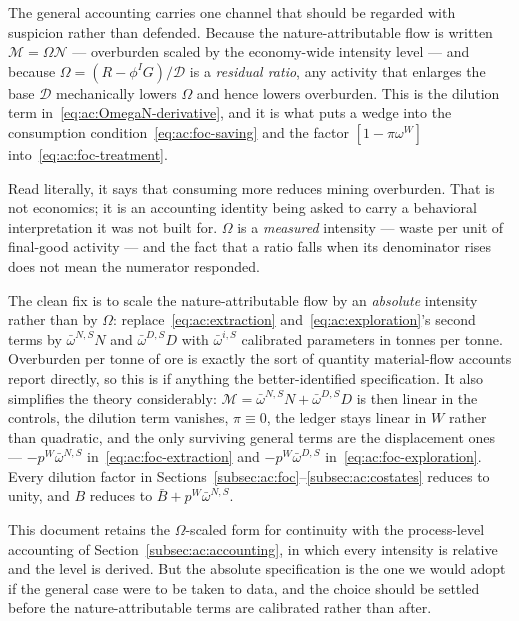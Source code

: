 \begin{remark}\label{rem:ac:dilution}
The general accounting carries one channel that should be regarded with suspicion rather than defended. Because the nature-attributable flow is written $\mathcal M=\Omega\mathcal N$ --- overburden scaled by the economy-wide intensity level --- and because $\Omega=\left(R-\phi^IG\right)/\mathcal D$ is a \emph{residual ratio}, any activity that enlarges the base $\mathcal D$ mechanically lowers $\Omega$ and hence lowers overburden. This is the dilution term in~\eqref{eq:ac:OmegaN-derivative}, and it is what puts a wedge into the consumption condition~\eqref{eq:ac:foc-saving} and the factor $\left[1-\pi\omega^W\right]$ into~\eqref{eq:ac:foc-treatment}.

Read literally, it says that consuming more reduces mining overburden. That is not economics; it is an accounting identity being asked to carry a behavioral interpretation it was not built for. $\Omega$ is a \emph{measured} intensity --- waste per unit of final-good activity --- and the fact that a ratio falls when its denominator rises does not mean the numerator responded.

The clean fix is to scale the nature-attributable flow by an \emph{absolute} intensity rather than by $\Omega$: replace~\eqref{eq:ac:extraction} and~\eqref{eq:ac:exploration}'s second terms by $\bar\omega^{N,S}N$ and $\bar\omega^{D,S}D$ with $\bar\omega^{i,S}$ calibrated parameters in tonnes per tonne. Overburden per tonne of ore is exactly the sort of quantity material-flow accounts report directly, so this is if anything the better-identified specification. It also simplifies the theory considerably: $\mathcal M=\bar\omega^{N,S}N+\bar\omega^{D,S}D$ is then linear in the controls, the dilution term vanishes, $\pi\equiv0$, the ledger stays linear in $W$ rather than quadratic, and the only surviving general terms are the displacement ones --- $-p^W\bar\omega^{N,S}$ in~\eqref{eq:ac:foc-extraction} and $-p^W\bar\omega^{D,S}$ in~\eqref{eq:ac:foc-exploration}. Every dilution factor in Sections~\ref{subsec:ac:foc}--\ref{subsec:ac:costates} reduces to unity, and $B$ reduces to $\bar B+p^W\bar\omega^{N,S}$.

This document retains the $\Omega$-scaled form for continuity with the process-level accounting of Section~\ref{subsec:ac:accounting}, in which every intensity is relative and the level is derived. But the absolute specification is the one we would adopt if the general case were to be taken to data, and the choice should be settled before the nature-attributable terms are calibrated rather than after.
\end{remark}

